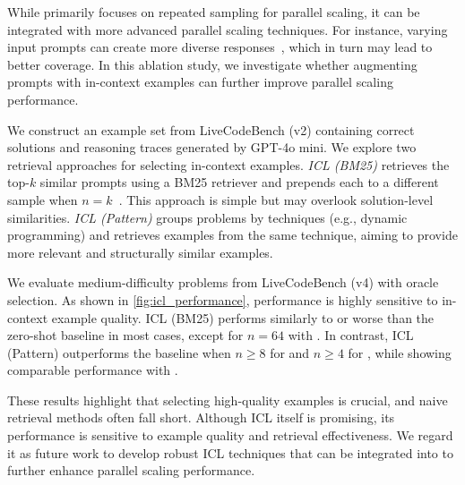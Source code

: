 While \frameworkname primarily focuses on repeated sampling for parallel scaling, it can be integrated with more advanced parallel scaling techniques. For instance, varying input prompts can create more diverse responses~\citep{lambert2024t}, which in turn may lead to better coverage.
In this ablation study, we investigate whether augmenting prompts with in-context examples can further improve parallel scaling performance.


We construct an example set from LiveCodeBench (v2) containing correct solutions and reasoning traces generated by GPT-4o mini. We explore two retrieval approaches for selecting in-context examples. \emph{ICL (BM25)} retrieves the top-$k$ similar prompts using a BM25 retriever and prepends each to a different sample when $n = k$~\citep{robertson2009probabilistic}. This approach is simple but may overlook solution-level similarities. \emph{ICL (Pattern)} groups problems by techniques (e.g., dynamic programming) and retrieves examples from the same technique, aiming to provide more relevant and structurally similar examples.



We evaluate medium-difficulty problems from LiveCodeBench (v4) with oracle selection. As shown in \cref{fig:icl_performance}, performance is highly sensitive to in-context example quality. ICL (BM25) performs similarly to or worse than the zero-shot baseline in most cases, except for $n=64$ with \qwenthirtytwob. In contrast, ICL (Pattern) outperforms the baseline when $n \geq 8$ for \qwensevenb and $n \geq 4$ for \qwenthirtytwob, while showing comparable performance with \fouromini.

These results highlight that selecting high-quality examples is crucial, and naive retrieval methods often fall short. Although ICL itself is promising, its performance is sensitive to example quality and retrieval effectiveness. We regard it as future work to develop robust ICL techniques that can be integrated into \frameworkname to further enhance parallel scaling performance.

